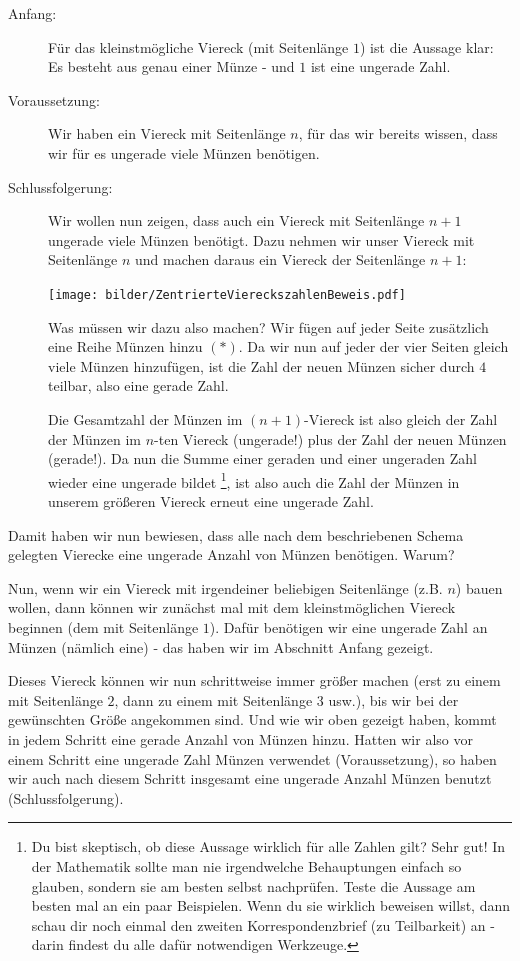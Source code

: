 \documentclass[a4paper,ngerman,12pt]{scrartcl}
\theoremstyle{definition}
\theoremstyle{plain}
\theoremstyle{remark}
\begin{document}
\begin{description}
	\item[Anfang:] Für das kleinstmögliche Viereck (mit Seitenlänge $1$) ist die Aussage klar: Es besteht aus genau einer Münze - und $1$ ist eine ungerade Zahl.
	\item[Voraussetzung:] Wir haben ein Viereck mit Seitenlänge $n$, für das wir bereits wissen, dass wir für es ungerade viele Münzen benötigen.
	\item[Schlussfolgerung:] Wir wollen nun zeigen, dass auch ein Viereck mit Seitenlänge $n+1$ ungerade viele Münzen benötigt. Dazu nehmen wir unser Viereck mit Seitenlänge $n$ und machen daraus ein Viereck der Seitenlänge $n+1$:
	\begin{center}
		\texttt{[image: bilder/ZentrierteViereckszahlenBeweis.pdf]}
	\end{center}
	Was müssen wir dazu also machen? Wir fügen auf jeder Seite zusätzlich eine Reihe Münzen hinzu $(\ast)$. Da wir nun auf jeder der vier Seiten gleich viele Münzen hinzufügen, ist die Zahl der neuen Münzen sicher durch $4$ teilbar, also eine gerade Zahl.
	
	Die Gesamtzahl der Münzen im $(n+1)$-Viereck ist also gleich der Zahl der Münzen im $n$-ten Viereck (ungerade!) plus der Zahl der neuen Münzen (gerade!). Da nun die Summe einer geraden und einer ungeraden Zahl wieder eine ungerade bildet
	\footnote{Du bist skeptisch, ob diese Aussage wirklich für alle Zahlen gilt? Sehr gut! In der Mathematik sollte man nie irgendwelche Behauptungen einfach so glauben, sondern sie am besten selbst nachprüfen. Teste die Aussage am besten mal an ein paar Beispielen. Wenn du sie wirklich beweisen willst, dann schau dir noch einmal den zweiten Korrespondenzbrief (zu Teilbarkeit) an - darin findest du alle dafür notwendigen Werkzeuge.},
	ist also auch die Zahl der Münzen in unserem größeren Viereck erneut eine ungerade Zahl.
\end{description}

Damit haben wir nun bewiesen, dass alle nach dem beschriebenen Schema gelegten Vierecke eine ungerade Anzahl von Münzen benötigen. Warum?

Nun, wenn wir ein Viereck mit irgendeiner beliebigen Seitenlänge (z.B. $n$) bauen wollen, dann können wir zunächst mal mit dem kleinstmöglichen Viereck beginnen (dem mit Seitenlänge $1$). Dafür benötigen wir eine ungerade Zahl an Münzen (nämlich eine) - das haben wir im Abschnitt \glqq Anfang\grqq{} gezeigt.

Dieses Viereck können wir nun schrittweise immer größer machen (erst zu einem mit Seitenlänge $2$, dann zu einem mit Seitenlänge $3$ usw.), bis wir bei der gewünschten Größe angekommen sind. Und wie wir oben gezeigt haben, kommt in jedem Schritt eine gerade Anzahl von Münzen hinzu. Hatten wir also vor einem Schritt eine ungerade Zahl Münzen verwendet (\glqq Voraussetzung\grqq ), so haben wir auch nach diesem Schritt insgesamt eine ungerade Anzahl Münzen benutzt (\glqq Schlussfolgerung\grqq ).
\end{document}
